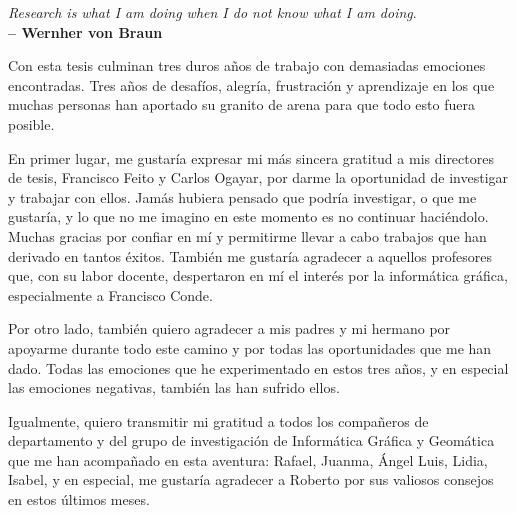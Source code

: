 \newpage
\begin{flushright}
	\textit{Research is what I am doing when I do not know what I am doing}.\\
    \textbf{-- Wernher von Braun}
\end{flushright}


\normalsize
\libertineNormal



\noindent Con esta tesis culminan tres duros años de trabajo con demasiadas emociones encontradas. Tres años de desafíos, alegría, frustración y aprendizaje en los que muchas personas han aportado su granito de arena para que todo esto fuera posible. 

\noindent En primer lugar, me gustaría expresar mi más sincera gratitud a mis directores de tesis, Francisco Feito y Carlos Ogayar, por darme la oportunidad de investigar y trabajar con ellos. Jamás hubiera pensado que podría investigar, o que me gustaría, y lo que no me imagino en este momento es no continuar haciéndolo. Muchas gracias por confiar en mí y permitirme llevar a cabo trabajos que han derivado en tantos éxitos. También me gustaría agradecer a aquellos profesores que, con su labor docente, despertaron en mí el interés por la informática gráfica, especialmente a Francisco Conde. 

\noindent Por otro lado, también quiero agradecer a mis padres y mi hermano por apoyarme durante todo este camino y por todas las oportunidades que me han dado. Todas las emociones que he experimentado en estos tres años, y en especial las emociones negativas, también las han sufrido ellos.

\noindent Igualmente, quiero transmitir mi gratitud a todos los compañeros de departamento y del grupo de investigación de Informática Gráfica y Geomática que me han acompañado en esta aventura: Rafael, Juanma, Ángel Luis, Lidia, Isabel, y en especial, me gustaría agradecer a Roberto por sus valiosos consejos en estos últimos meses. 

